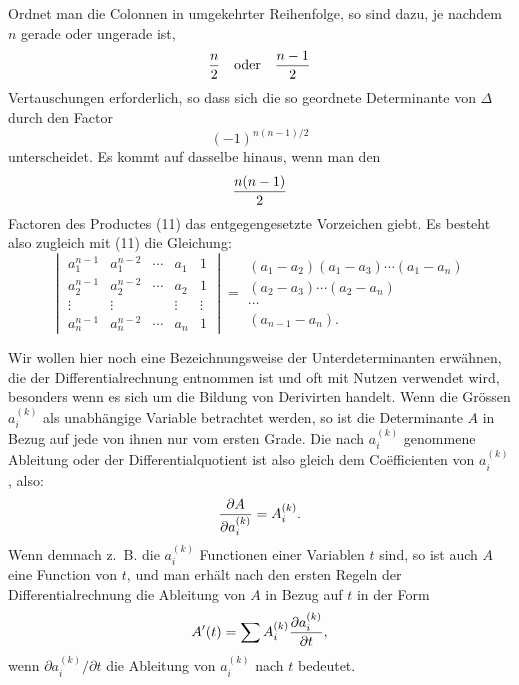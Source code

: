 
Ordnet man die Colonnen in umgekehrter Reihenfolge, so sind dazu, je nachdem \(n\) gerade oder ungerade ist,
\[
 {n\over2}\quad \hbox{oder}\quad {n-1\over2}
\]
Vertauschungen erforderlich, so dass sich die so geordnete Determinante von \(\Delta\) durch den Factor
\[
 (-1)^{n(n-1)/2}
\]
unterscheidet. Es kommt auf dasselbe hinaus, wenn man den
\[
 {n(n-1)\over2}
\]
Factoren des Productes (11) das entgegengesetzte Vorzeichen giebt. Es besteht also zugleich mit (11) die Gleichung:
\begin{equation}
\begin{vmatrix}
a_1^{n-1}&a_1^{n-2}&\cdots&a_1&1\\
a_2^{n-1}&a_2^{n-2}&\cdots&a_2&1\\
\vdots&\vdots&&\vdots&\vdots\\
a_n^{n-1}&a_n^{n-2}&\cdots&a_n&1
\end{vmatrix}
=
\begin{gathered}
(a_1-a_2)(a_1-a_3)\cdots(a_1-a_n)\\
(a_2-a_3)\cdots(a_2-a_n)\\
\cdots\\
(a_{n-1}-a_n).
\end{gathered}
\tag{12}
\end{equation}

Wir wollen hier noch eine Bezeichnungsweise der Unterdeterminanten erwähnen, die der Differentialrechnung entnommen ist und oft mit Nutzen verwendet wird, besonders wenn es sich um die Bildung von Derivirten handelt. Wenn die Grössen \(a_i^{(k)}\) als unabhängige Variable betrachtet werden, so ist die Determinante \(A\) in Bezug auf jede von ihnen nur vom ersten Grade. Die nach \(a_i^{(k)}\) genommene Ableitung oder der Differentialquotient ist also gleich dem Coëfficienten von \(a_i^{(k)}\), also:
\[
{\partial A\over \partial a_i^{(k)}}=A_i^{(k)}.
\]
Wenn demnach z.~B. die \(a_i^{(k)}\) Functionen einer Variablen \(t\) sind, so ist auch \(A\) eine Function von \(t\), und man erhält nach den ersten Regeln der Differentialrechnung die Ableitung von \(A\) in Bezug auf \(t\) in der Form
\[
A'(t)=\sum A_i^{(k)}{\partial a_i^{(k)}\over\partial t},
\]
wenn \({\partial a_i^{(k)}}/{\partial t}\) die Ableitung von \(a_i^{(k)}\) nach \(t\) bedeutet.
